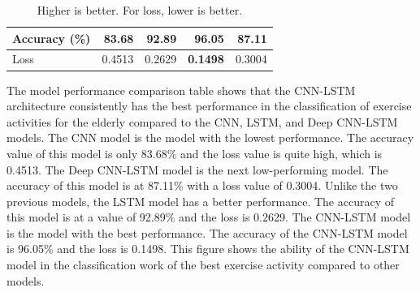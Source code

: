 \begin{table}[h!]
\begin{tabular}{|cl|r|r|r|r|}
		\multicolumn{2}{|l|}{Accuracy (\%)}                                                               & 83.68                    & 92.89                     & \textbf{96.05}                & 87.11                                                                                \\ \hline
		\multicolumn{2}{|l|}{Loss}                                                                        & 0.4513                   & 0.2629                    & \textbf{0.1498}               & 0.3004                                                                               \\ \hline
	\end{tabular}
	\caption*{Higher is better. For loss, lower is better.}
\end{table}

The model performance comparison table shows that the CNN-LSTM architecture consistently has the best performance in the classification of exercise activities for the elderly compared to the CNN, LSTM, and Deep CNN-LSTM models. The CNN model is the model with the lowest performance. The accuracy value of this model is only 83.68\% and the loss value is quite high, which is 0.4513. The Deep CNN-LSTM model is the next low-performing model. The accuracy of this model is at 87.11\% with a loss value of 0.3004. Unlike the two previous models, the LSTM model has a better performance. The accuracy of this model is at a value of 92.89\% and the loss is 0.2629. The CNN-LSTM model is the model with the best performance. The accuracy of the CNN-LSTM model is 96.05\% and the loss is 0.1498. This figure shows the ability of the CNN-LSTM model in the classification work of the best exercise activity compared to other models.

